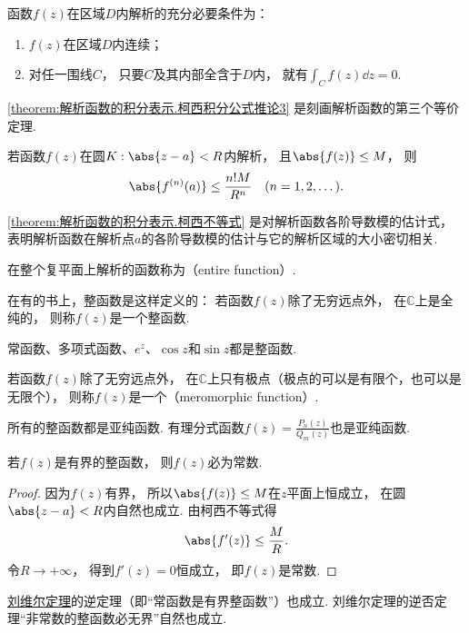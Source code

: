 \begin{theorem}\label{theorem:解析函数的积分表示.柯西积分公式推论3}
函数\(f(z)\)在区域\(D\)内解析的充分必要条件为：
\begin{enumerate}
	\item \(f(z)\)在区域\(D\)内连续；

	\item 对任一围线\(C\)，
	只要\(C\)及其内部全含于\(D\)内，
	就有\(\int_C f(z) \dd{z} = 0\).
\end{enumerate}
\end{theorem}
\cref{theorem:解析函数的积分表示.柯西积分公式推论3} 是刻画解析函数的第三个等价定理.

\begin{theorem}[柯西不等式]
若函数\(f(z)\)在圆\(K: \abs{z-a}<R\)内解析，
且\(\abs{f(z)} \leq M\)，
则\begin{equation}\label{theorem:解析函数的积分表示.柯西不等式}
	\abs{f^{(n)}(a)} \leq \frac{n! M}{R^n}
	\quad(n=1,2,\dots).
\end{equation}
\end{theorem}
\cref{theorem:解析函数的积分表示.柯西不等式} 是对解析函数各阶导数模的估计式，
表明解析函数在解析点\(a\)的各阶导数模的估计与它的解析区域的大小密切相关.

\begin{definition}
在整个复平面上解析的函数称为（entire function）.
\end{definition}
在有的书上，整函数是这样定义的：
若函数\(f(z)\)除了无穷远点外，
在\(\mathbb{C}\)上是全纯的，
则称\(f(z)\)是一个整函数.

\begin{example}
常函数、多项式函数、\(e^z\)、\(\cos z\)和\(\sin z\)都是整函数.
\end{example}

\begin{definition}
若函数\(f(z)\)除了无穷远点外，
在\(\mathbb{C}\)上只有极点（极点的可以是有限个，也可以是无限个），
则称\(f(z)\)是一个（meromorphic function）.
\end{definition}

\begin{example}
所有的整函数都是亚纯函数.
有理分式函数\(f(z) = \frac{P_n(z)}{Q_m(z)}\)也是亚纯函数.
\end{example}

\begin{theorem}[刘维尔定理]\label{theorem:解析函数的积分表示.刘维尔定理}
若\(f(z)\)是有界的整函数，
则\(f(z)\)必为常数.
\begin{proof}
因为\(f(z)\)有界，
所以\(\abs{f(z)} \leq M\)在\(z\)平面上恒成立，
在圆\(\abs{z-a}<R\)内自然也成立.
由柯西不等式得\begin{equation*}
	\abs{f'(z)} \leq \frac{M}{R}.
\end{equation*}
令\(R\to+\infty\)，
得到\(f'(z)=0\)恒成立，
即\(f(z)\)是常数.
\end{proof}
\end{theorem}
\hyperref[theorem:解析函数的积分表示.刘维尔定理]{刘维尔定理}的逆定理（即“常函数是有界整函数”）也成立.
刘维尔定理的逆否定理“非常数的整函数必无界”自然也成立.

